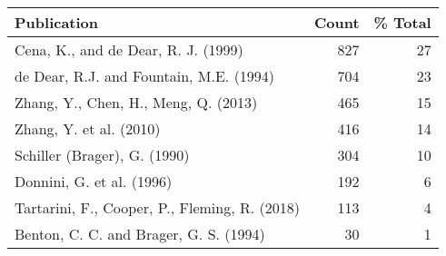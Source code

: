 \begin{tabular}{lrr}
\toprule
Publication & Count & \% Total \\
\midrule
Cena, K., and de Dear, R. J. (1999) & 827 & 27 \\
de Dear, R.J. and Fountain, M.E. (1994) & 704 & 23 \\
Zhang, Y., Chen, H., Meng, Q. (2013) & 465 & 15 \\
Zhang, Y. et al. (2010) & 416 & 14 \\
Schiller (Brager), G. (1990) & 304 & 10 \\
Donnini, G. et al. (1996) & 192 & 6 \\
Tartarini, F., Cooper, P., Fleming, R. (2018) & 113 & 4 \\
Benton, C. C. and Brager, G. S. (1994) & 30 & 1 \\
\bottomrule
\end{tabular}
